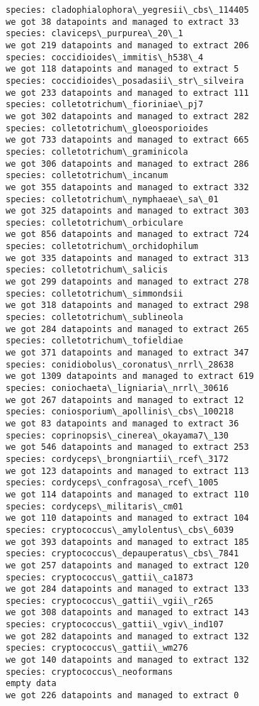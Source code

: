 \documentclass[11pt]{article}
\begin{document}
\begin{Verbatim}[commandchars=\\\{\}]
species: cladophialophora\_yegresii\_cbs\_114405
we got 38 datapoints and managed to extract 33
species: claviceps\_purpurea\_20\_1
we got 219 datapoints and managed to extract 206
species: coccidioides\_immitis\_h538\_4
we got 118 datapoints and managed to extract 5
species: coccidioides\_posadasii\_str\_silveira
we got 233 datapoints and managed to extract 111
species: colletotrichum\_fioriniae\_pj7
we got 302 datapoints and managed to extract 282
species: colletotrichum\_gloeosporioides
we got 733 datapoints and managed to extract 665
species: colletotrichum\_graminicola
we got 306 datapoints and managed to extract 286
species: colletotrichum\_incanum
we got 355 datapoints and managed to extract 332
species: colletotrichum\_nymphaeae\_sa\_01
we got 325 datapoints and managed to extract 303
species: colletotrichum\_orbiculare
we got 856 datapoints and managed to extract 724
species: colletotrichum\_orchidophilum
we got 335 datapoints and managed to extract 313
species: colletotrichum\_salicis
we got 299 datapoints and managed to extract 278
species: colletotrichum\_simmondsii
we got 318 datapoints and managed to extract 298
species: colletotrichum\_sublineola
we got 284 datapoints and managed to extract 265
species: colletotrichum\_tofieldiae
we got 371 datapoints and managed to extract 347
species: conidiobolus\_coronatus\_nrrl\_28638
we got 1309 datapoints and managed to extract 619
species: coniochaeta\_ligniaria\_nrrl\_30616
we got 267 datapoints and managed to extract 12
species: coniosporium\_apollinis\_cbs\_100218
we got 83 datapoints and managed to extract 36
species: coprinopsis\_cinerea\_okayama7\_130
we got 546 datapoints and managed to extract 253
species: cordyceps\_brongniartii\_rcef\_3172
we got 123 datapoints and managed to extract 113
species: cordyceps\_confragosa\_rcef\_1005
we got 114 datapoints and managed to extract 110
species: cordyceps\_militaris\_cm01
we got 110 datapoints and managed to extract 104
species: cryptococcus\_amylolentus\_cbs\_6039
we got 393 datapoints and managed to extract 185
species: cryptococcus\_depauperatus\_cbs\_7841
we got 257 datapoints and managed to extract 120
species: cryptococcus\_gattii\_ca1873
we got 284 datapoints and managed to extract 133
species: cryptococcus\_gattii\_vgii\_r265
we got 308 datapoints and managed to extract 143
species: cryptococcus\_gattii\_vgiv\_ind107
we got 282 datapoints and managed to extract 132
species: cryptococcus\_gattii\_wm276
we got 140 datapoints and managed to extract 132
species: cryptococcus\_neoformans
empty data
we got 226 datapoints and managed to extract 0

\end{Verbatim}
\end{document}
